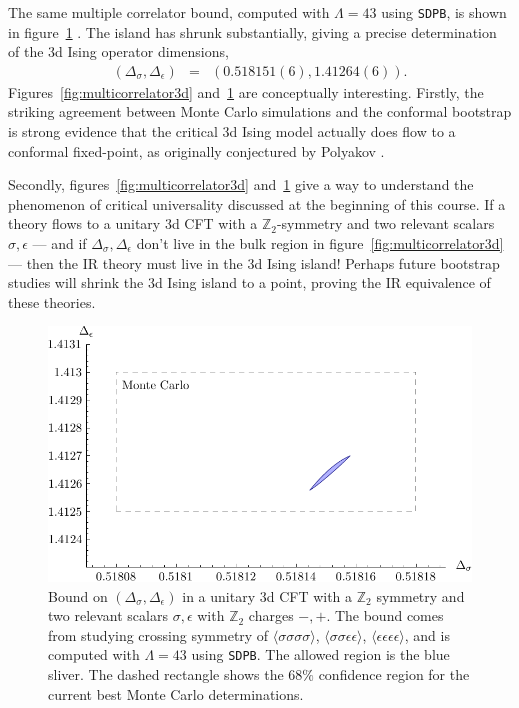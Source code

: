 \documentclass[11pt]{ws-rv9x6}
\newcommand\be{\begin{eqnarray}}
\newcommand\ee{\end{eqnarray}}
\newcommand\e\epsilon
\newcommand\<\langle
\renewcommand\>\rangle
\newcommand\Z{\mathbb{Z}}
\renewcommand\.{\cdot}
\newcommand\s\sigma
\newcommand\De{\Delta}
\begin{document}
The same multiple correlator bound, computed with $\Lambda=43$ using {\tt SDPB}, is shown in figure~\ref{fig:sdpbBound} \cite{Simmons-Duffin:2015qma}.  The island has shrunk substantially, giving a precise determination of the 3d Ising operator dimensions,
\be
(\De_\s,\De_\e) &=& (0.518151(6), 1.41264(6)).
\ee
Figures~\ref{fig:multicorrelator3d} and~\ref{fig:sdpbBound} are conceptually interesting.  Firstly, the striking agreement between Monte Carlo simulations and the conformal bootstrap is strong evidence that the critical 3d Ising model actually does flow to a conformal fixed-point, as originally conjectured by Polyakov \cite{Polyakov:1970xd}.

Secondly, figures~\ref{fig:multicorrelator3d} and~\ref{fig:sdpbBound} give a way to understand the phenomenon of critical universality discussed at the beginning of this course.  If a theory flows to a unitary 3d CFT with a $\Z_2$-symmetry and two relevant scalars $\s,\e$ --- and if $\De_\s,\De_\e$ don't live in the bulk region in figure~\ref{fig:multicorrelator3d} --- then the IR theory must live in the 3d Ising island!  Perhaps future bootstrap studies will shrink the 3d Ising island to a point, proving the IR equivalence of these theories.

\begin{figure}[hpt]
\begin{center}
\includegraphics[width=\textwidth]{sdpbBound}
\end{center}
\caption{\label{fig:sdpbBound} Bound on $(\De_\s,\De_\e)$ in a unitary 3d CFT with a $\Z_2$ symmetry and two relevant scalars $\s,\e$ with $\Z_2$ charges $-,+$.  The bound comes from studying crossing symmetry of $\<\s\s\s\s\>$, $\<\s\s\e\e\>$, $\<\e\e\e\e\>$, and is computed with $\Lambda=43$ using {\tt SDPB}. The allowed region is the blue sliver. The dashed rectangle shows the $68\%$ confidence region for the current best Monte Carlo determinations.}
\end{figure}
\end{document}
